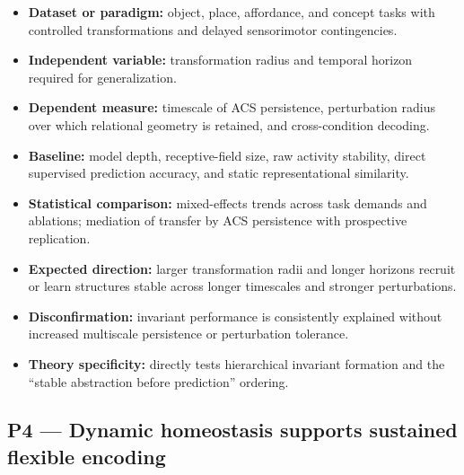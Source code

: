 \documentclass[
  11pt,
  a4paper,
]{article}
\providecommand{\tightlist}{%
  \setlength{\itemsep}{0pt}\setlength{\parskip}{0pt}}
\begin{document}
\begin{itemize}
\tightlist
\item
  \textbf{Dataset or paradigm:} object, place, affordance, and concept
  tasks with controlled transformations and delayed sensorimotor
  contingencies.
\item
  \textbf{Independent variable:} transformation radius and temporal
  horizon required for generalization.
\item
  \textbf{Dependent measure:} timescale of ACS persistence, perturbation
  radius over which relational geometry is retained, and cross-condition
  decoding.
\item
  \textbf{Baseline:} model depth, receptive-field size, raw activity
  stability, direct supervised prediction accuracy, and static
  representational similarity.
\item
  \textbf{Statistical comparison:} mixed-effects trends across task
  demands and ablations; mediation of transfer by ACS persistence with
  prospective replication.
\item
  \textbf{Expected direction:} larger transformation radii and longer
  horizons recruit or learn structures stable across longer timescales
  and stronger perturbations.
\item
  \textbf{Disconfirmation:} invariant performance is consistently
  explained without increased multiscale persistence or perturbation
  tolerance.
\item
  \textbf{Theory specificity:} directly tests hierarchical invariant
  formation and the ``stable abstraction before prediction'' ordering.
\end{itemize}

\subsection{P4 --- Dynamic homeostasis supports sustained flexible
encoding}\label{p4-dynamic-homeostasis-supports-sustained-flexible-encoding}
\end{document}
